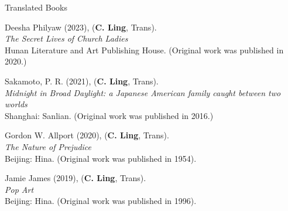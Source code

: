 \documentclass[12pt]{resume}
\begin{document}
\begin{rSection}{Translated Books}
\item Deesha Philyaw (2023), 
(\textbf{C. Ling}, Trans).\\
\textit{The Secret Lives of Church Ladies}\\
Hunan Literature and Art Publishing House. (Original work was published in 2020.)

\item Sakamoto, P. R. (2021), 
(\textbf{C. Ling}, Trans).\\
\textit{Midnight in Broad Daylight: a Japanese American family caught between two worlds}\\
Shanghai: Sanlian. (Original work was published in 2016.)

\item Gordon W. Allport (2020), (\textbf{C. Ling}, Trans). \\
\textit{The Nature of Prejudice}\\
Beijing: Hina. (Original work was published in 1954).

\item Jamie James (2019), (\textbf{C. Ling}, Trans).\\
\textit{Pop Art }\\
Beijing: Hina. (Original work was published in 1996).






\end{rSection}
\end{document}
